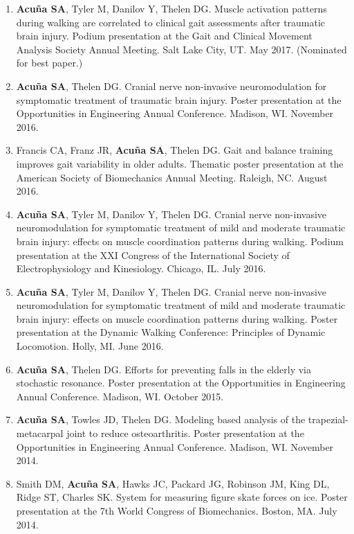 \documentclass[letterpaper, 10pt]{article}
\begin{document}
\begin{enumerate}
    \item \textbf{Acuña SA}, Tyler M, Danilov Y, Thelen DG. Muscle activation patterns during walking are correlated to clinical gait assessments after traumatic brain injury. Podium presentation at the Gait and Clinical Movement Analysis Society Annual Meeting. Salt Lake City, UT. May 2017. (Nominated for best paper.)
    \item \textbf{Acuña SA}, Thelen DG. Cranial nerve non-invasive neuromodulation for symptomatic treatment of traumatic brain injury. Poster presentation at the Opportunities in Engineering Annual Conference. Madison, WI. November 2016.
    \item Francis CA, Franz JR, \textbf{Acuña SA}, Thelen DG. Gait and balance training improves gait variability in older adults. Thematic poster presentation at the American Society of Biomechanics Annual Meeting. Raleigh, NC. August 2016.
    \item \textbf{Acuña SA}, Tyler M, Danilov Y, Thelen DG. Cranial nerve non-invasive neuromodulation for symptomatic treatment of mild and moderate traumatic brain injury: effects on muscle coordination patterns during walking. Podium presentation at the XXI Congress of the International Society of Electrophysiology and Kinesiology. Chicago, IL. July 2016.
    \item \textbf{Acuña SA}, Tyler M, Danilov Y, Thelen DG. Cranial nerve non-invasive neuromodulation for symptomatic treatment of mild and moderate traumatic brain injury: effects on muscle coordination patterns during walking. Poster presentation at the Dynamic Walking Conference: Principles of Dynamic Locomotion. Holly, MI. June 2016.
    \item \textbf{Acuña SA}, Thelen DG. Efforts for preventing falls in the elderly via stochastic resonance. Poster presentation at the Opportunities in Engineering Annual Conference. Madison, WI. October 2015.
    \item \textbf{Acuña SA}, Towles JD, Thelen DG. Modeling based analysis of the trapezial-metacarpal joint to reduce osteoarthritis. Poster presentation at the Opportunities in Engineering Annual Conference. Madison, WI. November 2014.
    \item Smith DM, \textbf{Acuña SA}, Hawks JC, Packard JG, Robinson JM, King DL, Ridge ST, Charles SK. System for measuring ﬁgure skate forces on ice. Poster presentation at the 7th World Congress of Biomechanics. Boston, MA. July 2014.
    
\end{enumerate}
\end{document}
